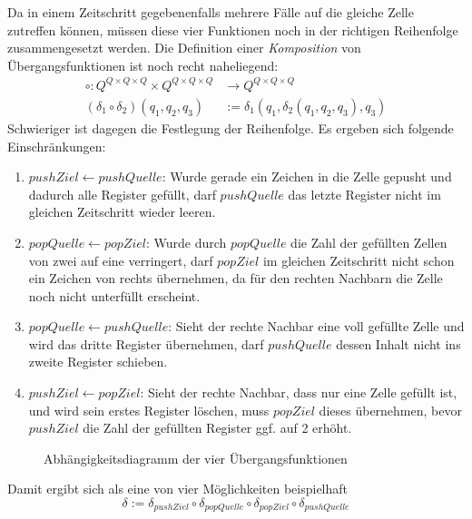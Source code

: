 \documentclass{article}
\begin{document}
Da in einem Zeitschritt gegebenenfalls mehrere Fälle auf die gleiche Zelle zutreffen können, müssen diese vier Funktionen noch in der richtigen Reihenfolge zusammengesetzt werden. Die Definition einer \emph{Komposition} von Übergangsfunktionen ist noch recht naheliegend:
\begin{align*}
    \circ : Q^{Q \times Q \times Q} \times Q^{Q \times Q \times Q} &\rightarrow Q^{Q \times Q \times Q} \\
    (\delta_1 \circ \delta_2)(q_1,q_2,q_3) &:= \delta_1(q_1,\delta_2(q_1,q_2,q_3),q_3)
\end{align*}
Schwieriger ist dagegen die Festlegung der Reihenfolge. Es ergeben sich folgende Einschränkungen:
\begin{enumerate}
    \item $pushZiel \leftarrow pushQuelle$: Wurde gerade ein Zeichen in die Zelle gepusht und dadurch alle Register gefüllt, darf $pushQuelle$ das letzte Register nicht im gleichen Zeitschritt wieder leeren.
    \item $popQuelle \leftarrow popZiel$: Wurde durch $popQuelle$ die Zahl der gefüllten Zellen von zwei auf eine verringert, darf $popZiel$ im gleichen Zeitschritt nicht schon ein Zeichen von rechts übernehmen, da für den rechten Nachbarn die Zelle noch nicht unterfüllt erscheint.
    \item $popQuelle \leftarrow pushQuelle$: Sieht der rechte Nachbar eine voll gefüllte Zelle und wird das dritte Register übernehmen, darf $pushQuelle$ dessen Inhalt nicht ins zweite Register schieben.
    \item $pushZiel \leftarrow popZiel$: Sieht der rechte Nachbar, dass nur eine Zelle gefüllt ist, und wird sein erstes Register löschen, muss $popZiel$ dieses übernehmen, bevor $pushZiel$ die Zahl der gefüllten Register ggf. auf 2 erhöht.
\end{enumerate}

\begin{figure}[h]
    \centering
    \caption{Abhängigkeitsdiagramm der vier Übergangsfunktionen}
\end{figure}
Damit ergibt sich als eine von vier Möglichkeiten beispielhaft
    \[ \delta := \delta_{pushZiel} \circ \delta_{popQuelle} \circ \delta_{popZiel} \circ \delta_{pushQuelle} \]
\end{document}
